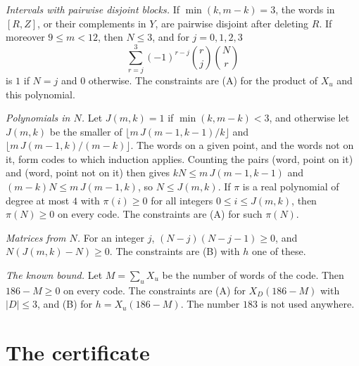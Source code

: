 \documentclass[11pt,a4paper]{article}
\newcommand{\abs}[1]{\lvert #1\rvert}
\begin{document}
\emph{Intervals with pairwise disjoint blocks.} If $\min(k,m-k)=3$, the
words in $[R,Z]$, or their complements in $Y$, are pairwise disjoint after
deleting $R$. If moreover $9\le m<12$, then $N\le 3$, and for
$j=0,1,2,3$
\[
\sum_{r=j}^3(-1)^{r-j}\binom rj\binom Nr
\]
is $1$ if $N=j$ and $0$ otherwise. The constraints are (A) for the product
of $X_u$ and this polynomial.

\emph{Polynomials in $N$.} Let $J(m,k)=1$ if $\min(k,m-k)<3$, and otherwise
let $J(m,k)$ be the smaller of $\lfloor m\,J(m-1,k-1)/k\rfloor$ and
$\lfloor m\,J(m-1,k)/(m-k)\rfloor$. The words on a given point, and the words not on it, form codes to which
induction applies. Counting the pairs (word, point on it) and (word, point
not on it) then gives $kN\le m\,J(m-1,k-1)$ and $(m-k)N\le m\,J(m-1,k)$,
so $N\le J(m,k)$. If
$\pi$ is a real polynomial of degree at most $4$ with $\pi(i)\ge 0$ for
all integers $0\le i\le J(m,k)$, then $\pi(N)\ge 0$ on every code. The
constraints are (A) for such $\pi(N)$.

\emph{Matrices from $N$.} For an integer $j$, $(N-j)(N-j-1)\ge 0$, and
$N(J(m,k)-N)\ge 0$. The constraints are (B) with $h$ one of these.

\emph{The known bound.} Let $M=\sum_uX_u$ be the number of words of the
code. Then $186-M\ge 0$ on every code. The constraints are (A) for
$X_D(186-M)$ with $\abs D\le 3$, and (B) for $h=X_u(186-M)$. The number
$183$ is not used anywhere.

\section{The certificate}
\end{document}
